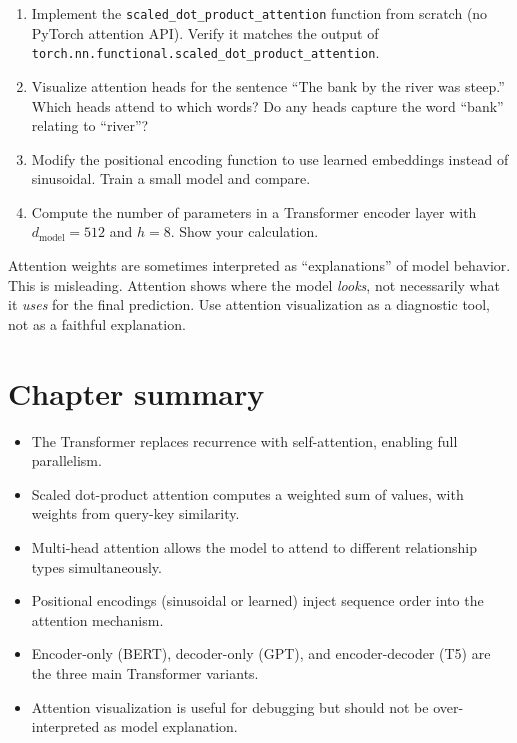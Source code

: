 \begin{exercise}
\begin{enumerate}
  \item Implement the \texttt{scaled\_dot\_product\_attention} function from scratch (no PyTorch attention API). Verify it matches the output of \texttt{torch.nn.functional.scaled\_dot\_product\_attention}.
  \item Visualize attention heads for the sentence ``The bank by the river was steep.'' Which heads attend to which words? Do any heads capture the word ``bank'' relating to ``river''?
  \item Modify the positional encoding function to use learned embeddings instead of sinusoidal. Train a small model and compare.
  \item Compute the number of parameters in a Transformer encoder layer with $d_{\text{model}}=512$ and $h=8$. Show your calculation.
\end{enumerate}
\end{exercise}

\begin{ethicsbox}
Attention weights are sometimes interpreted as ``explanations'' of model behavior. This is misleading. Attention shows where the model \emph{looks}, not necessarily what it \emph{uses} for the final prediction. Use attention visualization as a diagnostic tool, not as a faithful explanation.
\end{ethicsbox}

\section{Chapter summary}

\begin{itemize}
  \item The Transformer replaces recurrence with self-attention, enabling full parallelism.
  \item Scaled dot-product attention computes a weighted sum of values, with weights from query-key similarity.
  \item Multi-head attention allows the model to attend to different relationship types simultaneously.
  \item Positional encodings (sinusoidal or learned) inject sequence order into the attention mechanism.
  \item Encoder-only (BERT), decoder-only (GPT), and encoder-decoder (T5) are the three main Transformer variants.
  \item Attention visualization is useful for debugging but should not be over-interpreted as model explanation.
\end{itemize}
